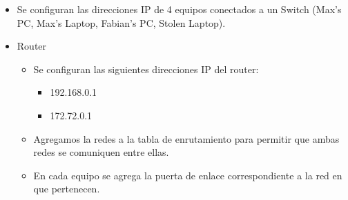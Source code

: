 \documentclass[spanish]{udpreport}
\begin{document}
\begin{itemize}
	\item Se configuran las direcciones IP de 4 equipos conectados a un Switch (Max's PC, Max's Laptop, Fabian's PC, Stolen Laptop).
	\item Router
	\begin{itemize}
		\item Se configuran las siguientes direcciones IP del router:
		\begin{itemize}
			\item 192.168.0.1
			\item 172.72.0.1
		\end{itemize}
		\item Agregamos la redes a la tabla de enrutamiento para permitir que ambas redes se comuniquen entre ellas.
		\item En cada equipo se agrega la puerta de enlace correspondiente a la red en que pertenecen.
	\end{itemize}
\end{itemize}
	
\end{document}
